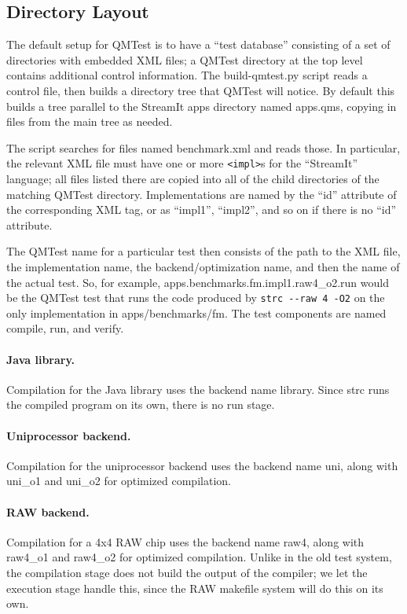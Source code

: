 \documentclass[11pt]{article}
\begin{document}
\subsection{Directory Layout}

The default setup for QMTest is to have a ``test
database'' consisting of a set of directories with embedded XML files;
a \textsf{QMTest} directory at the top level contains additional
control information.  The \textsf{build-qmtest.py} script reads a
control file, then builds a directory tree that QMTest will notice.
By default this builds a tree parallel to the StreamIt \textsf{apps}
directory named \textsf{apps.qms}, copying in files from the main tree
as needed.

The script searches for files named \textsf{benchmark.xml} and reads
those.  In particular, the relevant XML file must have one or more
\verb|<impl>|s for the ``StreamIt'' language; all files listed there
are copied into all of the child directories of the matching QMTest
directory.  Implementations are named by the ``id'' attribute of the
corresponding XML tag, or as ``impl1'', ``impl2'', and so on if there is 
no ``id'' attribute.

The QMTest name for a particular test then consists of the path to the
XML file, the implementation name, the backend/optimization name, and
then the name of the actual test.  So, for example,
\textsf{apps.benchmarks.fm.impl1.raw4\_o2.run} would be the QMTest test
that runs the code produced by \texttt{strc -{}-raw 4 -O2} on the only
implementation in \textsf{apps/benchmarks/fm}.  The test components
are named \textsf{compile}, \textsf{run}, and \textsf{verify}.

\paragraph{Java library.}  Compilation for the Java library uses the
backend name \textsf{library}.  Since \textsf{strc} runs the compiled
program on its own, there is no \textsf{run} stage.

\paragraph{Uniprocessor backend.}  Compilation for the uniprocessor
backend uses the backend name \textsf{uni}, along with
\textsf{uni\_o1} and \textsf{uni\_o2} for optimized compilation.

\paragraph{RAW backend.}  Compilation for a 4x4 RAW chip uses the
backend name \textsf{raw4}, along with \textsf{raw4\_o1} and
\textsf{raw4\_o2} for optimized compilation.  Unlike in the old test
system, the compilation stage does not build the output of the
compiler; we let the execution stage handle this, since the RAW
makefile system will do this on its own.
\end{document}
